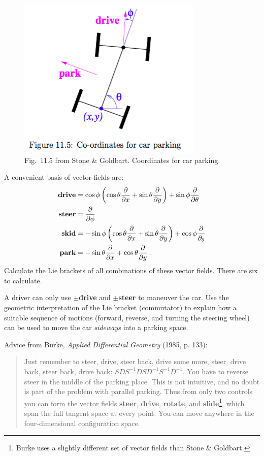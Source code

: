 \documentclass[12pt]{article}
\numberwithin{equation}{section}    %
\begin{document}
\begin{figure}
\begin{center}
	\includegraphics[width=.5\textwidth]{StoGo11}
	\caption{Fig.~11.5 from Stone \& Goldbart. Coordinates for car parking.}
	\end{center}
\end{figure}

A convenient basis of vector fields are:
\begin{align}
	\text{\textbf{drive}} &= \cos \phi \left(\cos \theta \frac{\partial}{\partial x} + \sin \theta \frac{\partial}{\partial y}\right) + \sin \phi \frac{\partial}{\partial \theta}
	\\
	\text{\textbf{steer}} &= 
	\frac{\partial}{\partial \phi}
	\\
	\text{\textbf{skid}} &= 
	-\sin\phi \left(\cos \theta \frac{\partial}{\partial x} + \sin \theta \frac{\partial}{\partial y}\right)
	+ \cos\phi \frac{\partial}{\partial_\theta}
	\\
	\text{\textbf{park}} &= -\sin \theta \frac{\partial}{\partial x} + \cos \theta \frac{\partial}{\partial y} \ .
\end{align}
Calculate the Lie brackets of all combinations of these vector fields. There are six to calculate.

A driver can only use $\pm$\textbf{drive} and $\pm$\textbf{steer} to maneuver the car. Use the geometric interpretation of the Lie bracket (commutator) to explain how a suitable sequence of motions (forward, reverse, and turning the steering wheel) can be used to move the car \emph{sideways} into a parking space. 

Advice from Burke, \emph{Applied Differential Geometry} (1985, p. 133):
\begin{quote}
	Just remember to steer, drive, steer back, drive some more, steer, drive back, steer back, drive back: $SDS^{-1}DSD^{-1}S^{-1}D^{-1}$. You have to reverse steer in the middle of the parking place. This is not intuitive, and no doubt is part of the problem with parallel parking. Thus from only two controls you can form the vector fields \textbf{steer}, \textbf{drive}, \textbf{rotate}, and \textbf{slide}\footnote{Burke uses a slightly different set of vector fields than Stone \& Goldbart.}, which span the full tangent space at every point. You can move anywhere in the four-dimensional configuration space.
\end{quote}
\end{document}
